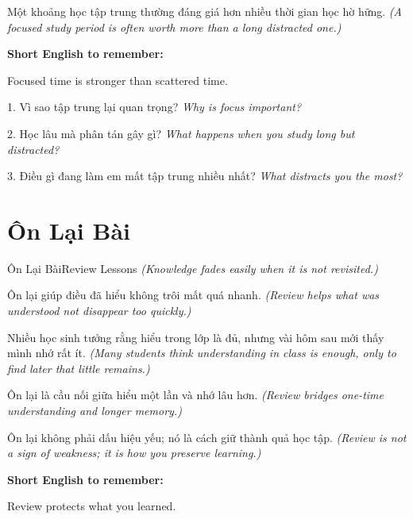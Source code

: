 \begin{baihoc}
Một khoảng học tập trung thường đáng giá hơn nhiều thời gian học hờ hững.
\textit{(A focused study period is often worth more than a long distracted one.)}
\end{baihoc}

\begin{ghinhoanh}
\textbf{Short English to remember:}

Focused time is stronger than scattered time.

\end{ghinhoanh}

\begin{tuhocnhanh}
1. Vì sao tập trung lại quan trọng? \textit{Why is focus important?}

2. Học lâu mà phân tán gây gì? \textit{What happens when you study long but distracted?}

3. Điều gì đang làm em mất tập trung nhiều nhất? \textit{What distracts you the most?}
\end{tuhocnhanh}
\ngancach

\section{Ôn Lại Bài}
\begin{truyen}{Ôn Lại Bài}{Review Lessons}
\textit{(Knowledge fades easily when it is not revisited.)}

Ôn lại giúp điều đã hiểu không trôi mất quá nhanh.
\textit{(Review helps what was understood not disappear too quickly.)}

Nhiều học sinh tưởng rằng hiểu trong lớp là đủ, nhưng vài hôm sau mới thấy mình nhớ rất ít.
\textit{(Many students think understanding in class is enough, only to find later that little remains.)}

Ôn lại là cầu nối giữa hiểu một lần và nhớ lâu hơn.
\textit{(Review bridges one-time understanding and longer memory.)}
\end{truyen}

\begin{baihoc}
Ôn lại không phải dấu hiệu yếu; nó là cách giữ thành quả học tập.
\textit{(Review is not a sign of weakness; it is how you preserve learning.)}
\end{baihoc}

\begin{ghinhoanh}
\textbf{Short English to remember:}

Review protects what you learned.

\end{ghinhoanh}

